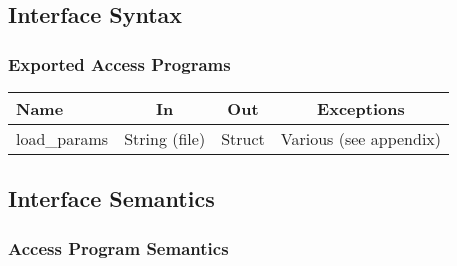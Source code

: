 \documentclass[12pt]{article}
\begin{document}
\subsection{Interface Syntax}



\subsubsection{Exported Access Programs}

\begin{center}
\begin{tabular}{l c c c}
\hline
\textbf{Name} & \textbf{In} & \textbf{Out} & \textbf{Exceptions} \\ \hline
load\_{params} & String (file) & Struct & Various (see appendix) \\
\hline
\end{tabular}
\end{center}


\subsection{Interface Semantics}




\subsubsection{Access Program Semantics}
\end{document}
